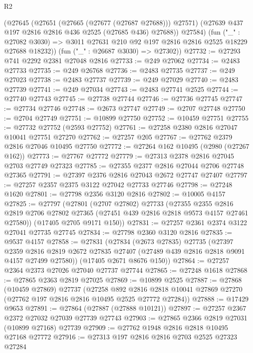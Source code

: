 \begin{lexlean}{R2}
\begin{coremodule}
          (@27645
            (@27651 (@27665 (@27677 (@27687 @27688))) @27571)
            (@27639 @437 @197 @2816 @2816 @436 @2525 (@27685 @436) @27688))
          @27584)
        (fun ("_" : @27082 @3030) =>
        @3011 @27631 @210 @92 @197 @2816 @2816 @2525 @18229 @27688 @18232))
      (fun ("_" : @26687 @3030) => @27302))
@27732 := @27293 @741 @2292 @2381 @27048 @2816
@27733 := @249 @27062
@27734 := @2483 @27733
@27735 := @249 @26768
@27736 := @2483 @27735
@27737 := @249 @27023
@27738 := @2483 @27737
@27739 := @249 @27029
@27740 := @2483 @27739
@27741 := @249 @27034
@27743 := @2483 @27741 @2525
@27744 := @27740 @27743
@27745 := @27738 @27744
@27746 := @27736 @27745
@27747 := @27734 @27746
@27748 := @2673 @27747
@27749 := @2707 @27748
@27750 := @2704 @27749
@27751 := @10899 @27750
@27752 := @10459 @27751
@27755 := @27732 @27752 (@2593 @27752)
@27761 := @27258 @2380 @2816 @27047 @10041 @27751 @27270
@27762 := @27257 @205
@27767 := @27762 @2379 @2816 @27046 @10495 @27750
@27772 := @27264 @162 @10495 (@2980 (@27267 @162))
@27773 := @27767 @27772
@27779 := @27313 @2378 @2816 @27045 @2703 @27749 @27323
@27785 := @27355 @2377 @2816 @27044 @2706 @27748 @27365
@27791 := @27397 @2376 @2816 @27043 @2672 @27747 @27407
@27797 := @27257 @2357 @2375 @3122 @27042 @27733 @27746
@27798 := @27248 @1620
@27801 := @27798 @2356 @3120 @2816
@27802 := @10005 @4157
@27825 := @27797
    (@27801
      (@2707 @27802)
      @27733
      (@27355
        @2355
        @2816
        @2819
        @2706
        @27802
        @27365
        (@27451 @439 @2816 @2818 @9573 @4157 @27461 @27580))
      (@17405 @2705 @9171 @150))
@27831 := @27257 @2361 @2374 @3122 @27041 @27735 @27745
@27834 := @27798 @2360 @3120 @2816
@27835 := @9537 @4157
@27858 := @27831
    (@27834
      (@2673 @27835)
      @27735
      (@27397
        @2359
        @2816
        @2819
        @2672
        @27835
        @27407
        (@27489 @439 @2816 @2818 @9091 @4157 @27499 @27580))
      (@17405 @2671 @8676 @150))
@27864 := @27257 @2364 @2373 @27026 @27040 @27737 @27744
@27865 := @27248 @1618
@27868 := @27865 @2363 @2819 @27025
@27869 := @10899 @2525
@27887 := @27868
    (@10459 @27869)
    @27737
    (@27258
      @892
      @2816
      @2818
      @10041
      @27869
      @27270
      (@27762 @197 @2816 @2816 @10495 @2525 @27772 @27284))
@27888 := @17429 @9653
@27891 := @27864 (@27887 (@27888 @10121))
@27897 := @27257 @2367 @2372 @27032 @27039 @27739 @27743
@27903 := @27865 @2366 @2819 @27031 (@10899 @27168) @27739
@27909 := @27762 @1948 @2816 @2818 @10495 @27168 @27772
@27916 := @27313 @197 @2816 @2816 @2703 @2525 @27323 @27284

\end{coremodule}
\end{lexlean}

